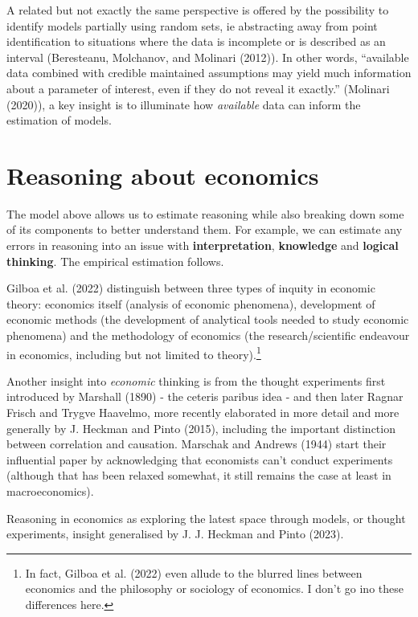 \documentclass[
]{article}
\begin{document}
A related but not exactly the same perspective is offered by the
possibility to identify models partially using random sets, ie
abstracting away from point identification to situations where the data
is incomplete or is described as an interval (Beresteanu, Molchanov, and
Molinari (2012)). In other words, ``available data combined with
credible maintained assumptions may yield much information about a
parameter of interest, even if they do not reveal it exactly.''
(Molinari (2020)), a key insight is to illuminate how \emph{available}
data can inform the estimation of models.

\section{Reasoning about economics}\label{reasoning-about-economics}

The model above allows us to estimate reasoning while also breaking down
some of its components to better understand them. For example, we can
estimate any errors in reasoning into an issue with
\textbf{interpretation}, \textbf{knowledge} and \textbf{logical
thinking}. The empirical estimation follows.

Gilboa et al. (2022) distinguish between three types of inquity in
economic theory: economics itself (analysis of economic phenomena),
development of economic methods (the development of analytical tools
needed to study economic phenomena) and the methodology of economics
(the research/scientific endeavour in economics, including but not
limited to theory).\footnote{In fact, Gilboa et al. (2022) even allude
  to the blurred lines between economics and the philosophy or sociology
  of economics. I don't go ino these differences here.}

Another insight into \emph{economic} thinking is from the thought
experiments first introduced by Marshall (1890) - the ceteris paribus
idea - and then later Ragnar Frisch and Trygve Haavelmo, more recently
elaborated in more detail and more generally by J. Heckman and Pinto
(2015), including the important distinction between correlation and
causation. Marschak and Andrews (1944) start their influential paper by
acknowledging that economists can't conduct experiments (although that
has been relaxed somewhat, it still remains the case at least in
macroeconomics).

Reasoning in economics as exploring the latest space through models, or
thought experiments, insight generalised by J. J. Heckman and Pinto
(2023).
\end{document}
